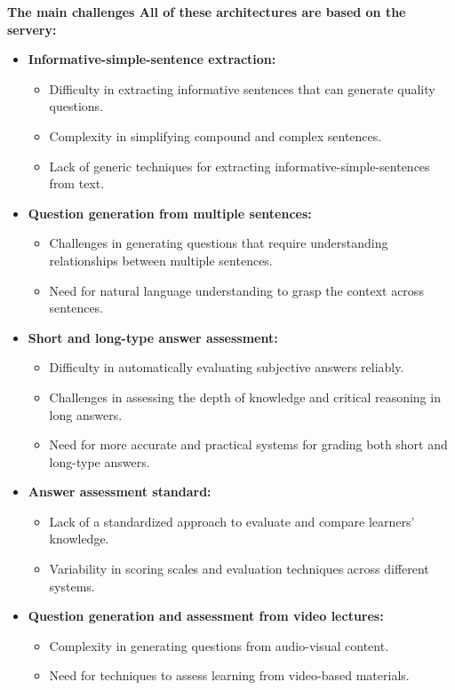  \textbf{The main challenges All of these architectures are based on the servery:}

\begin{itemize}
    \item \textbf{Informative-simple-sentence extraction:}
    \begin{itemize}
        \item Difficulty in extracting informative sentences that can generate quality questions.
        \item Complexity in simplifying compound and complex sentences.
        \item Lack of generic techniques for extracting informative-simple-sentences from text.
    \end{itemize}

    \item \textbf{Question generation from multiple sentences:}
    \begin{itemize}
        \item Challenges in generating questions that require understanding relationships between multiple sentences.
        \item Need for natural language understanding to grasp the context across sentences.
    \end{itemize}

    \item \textbf{Short and long-type answer assessment:}
    \begin{itemize}
        \item Difficulty in automatically evaluating subjective answers reliably.
        \item Challenges in assessing the depth of knowledge and critical reasoning in long answers.
        \item Need for more accurate and practical systems for grading both short and long-type answers.
    \end{itemize}

    \newpage
    \item \textbf{Answer assessment standard:}
    \begin{itemize}
        \item Lack of a standardized approach to evaluate and compare learners' knowledge.
        \item Variability in scoring scales and evaluation techniques across different systems.
    \end{itemize}

    \item \textbf{Question generation and assessment from video lectures:}
    \begin{itemize}
        \item Complexity in generating questions from audio-visual content.
        \item Need for techniques to assess learning from video-based materials.
    \end{itemize}


\end{itemize}
